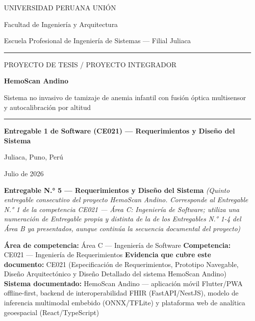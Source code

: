 \documentclass[11pt,a4paper]{article}
\begin{document}
\begin{titlepage}
\centering
\vspace*{1.2cm}
{\large UNIVERSIDAD PERUANA UNI\'ON\par}
{\normalsize Facultad de Ingenier\'ia y Arquitectura\par}
{\normalsize Escuela Profesional de Ingenier\'ia de Sistemas --- Filial Juliaca\par}
\vspace{0.5cm}
\rule{0.6\linewidth}{0.4pt}
\vspace{1.6cm}

{\large PROYECTO DE TESIS / PROYECTO INTEGRADOR\par}
\vspace{1.0cm}
{\huge\bfseries HemoScan Andino\par}
\vspace{0.6cm}
{\Large Sistema no invasivo de tamizaje de anemia infantil con fusi\'on \'optica multisensor y autocalibraci\'on por altitud\par}
\vspace{1.6cm}
\rule{0.6\linewidth}{0.4pt}
\vspace{1.6cm}

{\Large\bfseries Entregable 1 de Software (CE021) --- Requerimientos y Dise\~no del Sistema\par}
\vspace{2.0cm}

{\normalsize Juliaca, Puno, Per\'u \par}
{\normalsize Julio de 2026\par}

\vfill
\end{titlepage}

\tableofcontents
\newpage

\textbf{Entregable N.° 5 --- Requerimientos y Diseño del Sistema}
\emph{(Quinto entregable consecutivo del proyecto HemoScan Andino. Corresponde al Entregable N.° 1 de la competencia CE021 --- Área C: Ingeniería de Software; utiliza una numeración de Entregable propia y distinta de la de los Entregables N.° 1-4 del Área B ya presentados, aunque continúa la secuencia documental del proyecto)}

\textbf{Área de competencia:} Área C --- Ingeniería de Software
\textbf{Competencia:} CE021 --- Ingeniería de Requerimientos
\textbf{Evidencia que cubre este documento:} CE021 (Especificación de Requerimientos, Prototipo Navegable, Diseño Arquitectónico y Diseño Detallado del sistema HemoScan Andino)
\textbf{Sistema documentado:} HemoScan Andino --- aplicación móvil Flutter/PWA offline-first, backend de interoperabilidad FHIR (FastAPI/NestJS), modelo de inferencia multimodal embebido (ONNX/TFLite) y plataforma web de analítica geoespacial (React/TypeScript)
\end{document}
